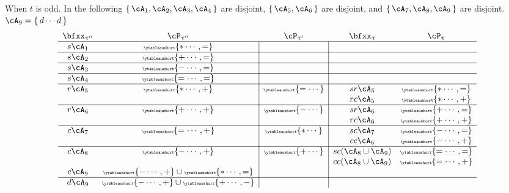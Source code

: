 \documentclass[12pt,a4paper]{amsart}
\numberwithin{equation}{section}
\theoremstyle{remark}
\let\ytb=\ytableaushort
\newcommand{\tytb}[1]{{\tiny\ytb{#1}}}
\def\uptaup{\uptau^{\prime}}
\def\uptaupp{\uptau^{\prime\prime}}
\begin{document}
{When $t$ is odd.
In the following
$\set{\cA_{1},\cA_{2}, \cA_{3},\cA_{4}}$ are disjoint, $\set{\cA_{5},\cA_{6}}$ are disjoint,
and $\set{\cA_{7},\cA_{8},\cA_{9}}$ %
are disjoint.
$\cA_{9}=\set{d\cdots d}$
\begin{equation} \label{eq:B1-2}
\begin{array}{cc|c|cc}
  \bfxx_{\uptaupp} & \cP_{\uptaupp}         & \cP_{\uptaup} & \bfxx_{\uptau} & \cP_{\uptau} \\
  \hline
  s\cA_{1}              & \tytb{\ast\cdots ,=} &                                      \\
  \hline
  s\cA_{2}              & \tytb{+\cdots,=}          &                                     \\
  \hline
  s\cA_{3}              & \tytb{-\cdots,=}          &                                 \\
  \hline
  s\cA_{4}              & \tytb{=\cdots,=} &                                      \\
  \hline
  r\cA_{5}              & \tytb{\ast\cdots,+} & \tytb{=\cdots}  & sr\cA_{5} & \tytb{\ast\cdots,=}                      \\
                        &                    &                & rc\cA_{5} &\tytb{\ast\cdots,+}                         \\
  \hline
  r\cA_{6}              & \tytb{+\cdots,+} & \tytb{-\cdots}    & sr\cA_{6} &  \tytb{+\cdots,=}                    \\
                        &                    &                & rc\cA_{6} &\tytb{+\cdots,+}                          \\
  \hline
  c\cA_{7}              & \tytb{=\cdots,+}          & \tytb{\ast\cdots} & sc\cA_{7} & \tytb{-\cdots,=}                                        \\
                        &                    &                & cc\cA_{6} &\tytb{-\cdots,+}                                \\
  \hline
  c\cA_{8}              & \tytb{-\cdots,+}          & \tytb{+\cdots} & sc(\cA_{8}\cup \cA_{9}) &\tytb{=\cdots,=}             \\
                        &                    &                & cc(\cA_{8}\cup \cA_{9}) &\tytb{=\cdots,+}                                   \\
  c\cA_{9}              & \tytb{-\cdots,+}\cup \tytb{\ast\cdots,=} & \\
  \hline
  d\cA_{9}              & \tytb{-\cdots,+}\cup \tytb{+\cdots,-}  &

\end{array}
\end{equation}}
\end{document}
